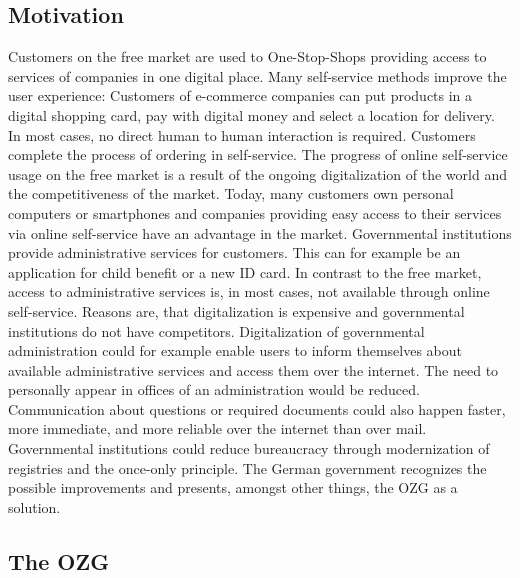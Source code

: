 \documentclass[
     12pt,         %
     a4paper,      %
     BCOR=10mm,version=first,     %
     DIV=14,version=first,        %
     ]{scrreprt}
\begin{document}
\subsection{Motivation}

Customers on the free market are used to One-Stop-Shops providing access to services of companies in one digital place. Many self-service methods improve the user experience: Customers of e-commerce companies can put products in a digital shopping card, pay with digital money and select a location for delivery. In most cases, no direct human to human interaction is required. Customers complete the process of ordering in self-service. The progress of online self-service usage on the free market is a result of the ongoing digitalization of the world and the competitiveness of the market. Today, many customers own personal computers or smartphones and companies providing easy access to their services via online self-service have an advantage in the market.
Governmental institutions provide administrative services for customers. This can for example be an application for child benefit or a new ID card. In contrast to the free market, access to administrative services is, in most cases, not available through online self-service. Reasons are, that digitalization is expensive and governmental institutions do not have competitors.
Digitalization of governmental administration could for example enable users to inform themselves about available administrative services and access them over the internet. The need to personally appear in offices of an administration would be reduced. Communication about questions or required documents could also happen faster, more immediate, and more reliable over the internet than over mail. Governmental institutions could reduce bureaucracy through modernization of registries and the once-only principle.
The German government recognizes the possible improvements and presents, amongst other things, the OZG as a solution. \cite{IT-Planungsrat:Herausforderung}

\subsection{The OZG}
\end{document}
